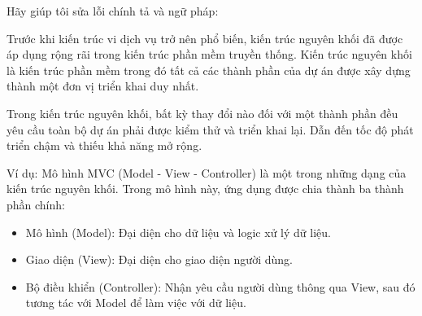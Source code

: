 Hãy giúp tôi sửa lỗi chính tả và ngữ pháp:






Trước khi kiến trúc vi dịch vụ trở nên phổ biến, kiến trúc nguyên khối đã được áp dụng rộng rãi trong kiến trúc phần mềm truyền thống. Kiến trúc nguyên khối là kiến trúc phần mềm trong đó tất cả các thành phần của dự án được xây dựng thành một đơn vị triển khai duy nhất.

Trong kiến trúc nguyên khối, bất kỳ thay đổi nào đối với một thành phần đều yêu cầu toàn bộ dự án phải được kiểm thử và triển khai lại. Dẫn đến tốc độ phát triển chậm và thiếu khả năng mở rộng.

Ví dụ: Mô hình MVC (Model - View - Controller) là một trong những dạng của kiến trúc nguyên khối. Trong mô hình này, ứng dụng được chia thành ba thành phần chính:

\begin{itemize}

\item Mô hình (Model): Đại diện cho dữ liệu và logic xử lý dữ liệu.

\item Giao diện (View): Đại diện cho giao diện người dùng.

\item Bộ điều khiển (Controller): Nhận yêu cầu người dùng thông qua View, sau đó tương tác với Model để làm việc với dữ liệu.

\end{itemize}

